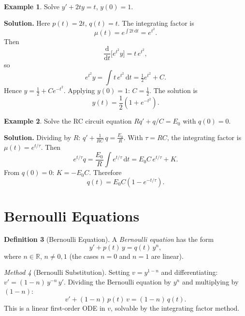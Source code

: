 \documentclass[12pt,a4paper,openany]{book}
\theoremstyle{definition}
\newtheorem{definition}{Definition}[chapter]
\newtheorem{example}[definition]{Example}
\theoremstyle{plain}
\theoremstyle{remark}
\newtheorem{method}[definition]{Method}
\newcommand{\R}{\mathbb{R}}
\newcommand{\dd}{\mathrm{d}}
\begin{document}
\begin{example}
\label{ex:linear-1}
Solve $y' + 2ty = t$, $y(0) = 1$.

\textbf{Solution.} Here $p(t) = 2t$, $q(t) = t$. The integrating factor is
\[
  \mu(t) = e^{\int 2t\,\dd t} = e^{t^2}.
\]
Then
\[
  \frac{\dd}{\dd t}\!\bigl[e^{t^2}y\bigr] = t\,e^{t^2},
\]
so
\[
  e^{t^2}y = \int t\,e^{t^2}\,\dd t = \tfrac{1}{2}e^{t^2} + C.
\]
Hence $y = \frac{1}{2} + Ce^{-t^2}$. Applying $y(0)=1$: $C = \frac{1}{2}$. The solution is
\[
  y(t) = \frac{1}{2}\!\left(1 + e^{-t^2}\right).
\]
\end{example}

\begin{example}
\label{ex:linear-rc}
Solve the RC circuit equation $Rq' + q/C = E_0$ with $q(0)=0$.

\textbf{Solution.} Dividing by $R$: $q' + \frac{1}{RC}\,q = \frac{E_0}{R}$. With $\tau = RC$, the integrating factor is $\mu(t) = e^{t/\tau}$. Then
\[
  e^{t/\tau}q = \frac{E_0}{R}\int e^{t/\tau}\,\dd t = E_0 C\,e^{t/\tau} + K.
\]
From $q(0)=0$: $K = -E_0 C$. Therefore
\[
  q(t) = E_0 C\!\left(1 - e^{-t/\tau}\right).
\]
\end{example}

\section{Bernoulli Equations}
\label{sec:bernoulli}

\begin{definition}[Bernoulli Equation]
\label{def:bernoulli}
A \emph{Bernoulli equation} has the form
\begin{equation}\label{eq:bernoulli}
  y' + p(t)\,y = q(t)\,y^n,
\end{equation}
where $n\in\R$, $n\ne 0,1$ (the cases $n=0$ and $n=1$ are linear).
\end{definition}

\begin{method}[Bernoulli Substitution]
\label{meth:bernoulli}
Setting $v = y^{1-n}$ and differentiating: $v' = (1-n)\,y^{-n}\,y'$. Dividing the Bernoulli equation by $y^n$ and multiplying by $(1-n)$:
\begin{equation}\label{eq:bernoulli-linear}
  v' + (1-n)\,p(t)\,v = (1-n)\,q(t).
\end{equation}
This is a linear first-order ODE in $v$, solvable by the integrating factor method.
\end{method}
\end{document}
